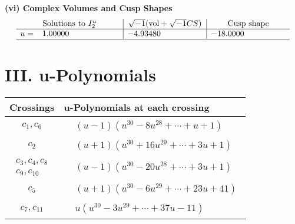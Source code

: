 \documentclass[1p]{elsarticle_modified}
\theoremstyle{definition}
\newcommand{\I}{\sqrt{-1}}
\begin{document}
\newpage\flushleft \textbf{(vi) Complex Volumes and Cusp Shapes}
$$\begin{array}{c|c|c}  
\text{Solutions to }I^u_{2}& \I (\text{vol} + \sqrt{-1}CS) & \text{Cusp shape}\\
 \hline 
\begin{aligned}
u &= \phantom{-}1.00000\phantom{ +0.000000I}\end{aligned}
 & -4.93480\phantom{ +0.000000I} & -18.0000\phantom{ +0.000000I}\\
 \hline 
 \end{array}$$\newpage
\newpage\renewcommand{\arraystretch}{1}
\centering \section*{ III. u-Polynomials}
\begin{tabular}{m{50pt}|m{274pt}}
Crossings & \hspace{64pt}u-Polynomials at each crossing \\
\hline $$\begin{aligned}c_{1},c_{6}\end{aligned}$$&$\begin{aligned}
&(u-1)(u^{30}-8 u^{28}+\cdots+u+1)
\end{aligned}$\\
\hline $$\begin{aligned}c_{2}\end{aligned}$$&$\begin{aligned}
&(u+1)(u^{30}+16 u^{29}+\cdots+3 u+1)
\end{aligned}$\\
\hline $$\begin{aligned}c_{3},c_{4},c_{8}\\c_{9},c_{10}\end{aligned}$$&$\begin{aligned}
&(u-1)(u^{30}-20 u^{28}+\cdots+3 u+1)
\end{aligned}$\\
\hline $$\begin{aligned}c_{5}\end{aligned}$$&$\begin{aligned}
&(u+1)(u^{30}-6 u^{29}+\cdots+23 u+41)
\end{aligned}$\\
\hline $$\begin{aligned}c_{7},c_{11}\end{aligned}$$&$\begin{aligned}
&u(u^{30}-3 u^{29}+\cdots+37 u-11)
\end{aligned}$\\
\hline
\end{tabular}\newpage\renewcommand{\arraystretch}{1}
\end{document}
